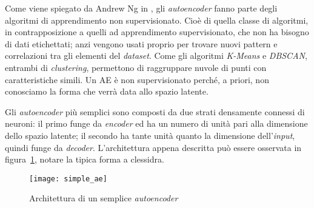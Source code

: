 Come viene spiegato da Andrew Ng in \cite{ng_sparse_ae}, gli \textit{autoencoder} fanno parte degli algoritmi di apprendimento non supervisionato.
Cioè di quella classe di algoritmi, in contrapposizione a quelli ad apprendimento supervisionato, che non ha bisogno di dati etichettati; anzi vengono usati proprio per trovare nuovi pattern e correlazioni tra gli elementi del \textit{dataset}.
Come gli algoritmi \textit{K-Means} e \textit{DBSCAN}, entrambi di \textit{clustering}, permettono di raggruppare nuvole di punti con caratteristiche simili. %
Un AE è non supervisionato perché, a priori, non conosciamo la forma che verrà data allo spazio latente. %

Gli \textit{autoencoder} più semplici sono composti da due strati densamente connessi di neuroni: il primo funge da \textit{encoder} ed ha un numero di unità pari alla dimensione dello spazio latente; il secondo ha tante unità quanto la dimensione dell'\textit{input}, quindi funge da \textit{decoder}.
L'architettura appena descritta può essere osservata in figura~\ref{fig:semplice_ae}, notare la tipica forma a clessidra.

\begin{figure}[ht] %
  \begin{center}
    \centering\texttt{[image: simple\_ae]}
  \end{center}
  \caption{Architettura di un semplice \textit{autoencoder}}
  \label{fig:semplice_ae}
\end{figure}

